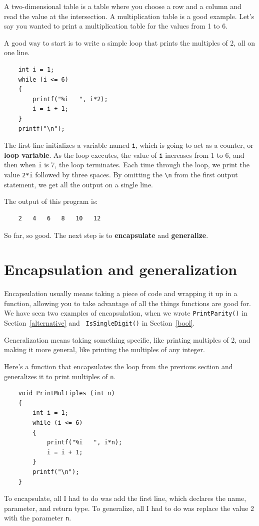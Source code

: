 A two-dimensional table is a table where you choose a row and
a column and read the value at the intersection.  A multiplication
table is a good example.  Let's say you wanted to print a
multiplication table for the values from 1 to 6.

A good way to start is to write a simple loop that prints
the multiples of 2, all on one line.

\begin{verbatim}
    int i = 1;
    while (i <= 6) 
    {
        printf("%i   ", i*2);
        i = i + 1;
    }
    printf("\n");
\end{verbatim}
%
The first line initializes a variable named {\tt i}, which is
going to act as a counter, or {\bf loop variable}.  As the
loop executes, the value of {\tt i} increases from 1 to 6,
and then when {\tt i} is 7, the loop terminates.  Each
time through the loop, we print the value {\tt 2*i} followed
by three spaces.  By omitting the  \verb+\n+ from the
first output statement, we get 
all the output on a single line.


The output of this program is:

\begin{verbatim}
    2   4   6   8   10   12
\end{verbatim}
%
So far, so good.  The next step is to {\bf encapsulate} and {\bf
generalize}.

\section {Encapsulation and generalization}

Encapsulation usually means taking a piece of code and wrapping it up
in a function, allowing you to take advantage of all the things functions
are good for.  We have seen two examples of encapsulation, when we
wrote {\tt PrintParity()} in Section~\ref{alternative} and {\tt
IsSingleDigit()} in Section~\ref{bool}.

Generalization means taking something specific, like printing
multiples of 2, and making it more general, like printing the
multiples of any integer.


Here's a function that encapsulates the loop from the previous
section and generalizes it to print multiples of {\tt n}.

\begin{verbatim}
    void PrintMultiples (int n)
    {
        int i = 1;
        while (i <= 6) 
        {
            printf("%i   ", i*n);
            i = i + 1;
        }
        printf("\n");
    }
\end{verbatim}
%
To encapsulate, all I had to do was add the first line,
which declares the name, parameter,
and return type.  To generalize, all I had to do was replace
the value 2 with the parameter {\tt n}.

